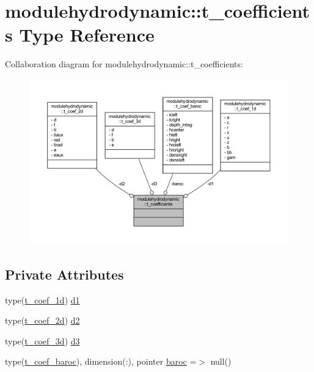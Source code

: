 \hypertarget{structmodulehydrodynamic_1_1t__coefficients}{}\section{modulehydrodynamic\+:\+:t\+\_\+coefficients Type Reference}
\label{structmodulehydrodynamic_1_1t__coefficients}


Collaboration diagram for modulehydrodynamic\+:\+:t\+\_\+coefficients\+:\nopagebreak
\begin{figure}[H]
\begin{center}
\leavevmode
\includegraphics[width=350pt]{structmodulehydrodynamic_1_1t__coefficients__coll__graph}
\end{center}
\end{figure}
\subsection*{Private Attributes}
\begin{DoxyCompactItemize}
\item 
type(\mbox{\hyperlink{structmodulehydrodynamic_1_1t__coef__1d}{t\+\_\+coef\+\_\+1d}}) \mbox{\hyperlink{structmodulehydrodynamic_1_1t__coefficients_af09bfaf9d33ac3ccd2662edfa7eff19b}{d1}}
\item 
type(\mbox{\hyperlink{structmodulehydrodynamic_1_1t__coef__2d}{t\+\_\+coef\+\_\+2d}}) \mbox{\hyperlink{structmodulehydrodynamic_1_1t__coefficients_a81edb2a1145e5a97e9aaca7bd5de81c2}{d2}}
\item 
type(\mbox{\hyperlink{structmodulehydrodynamic_1_1t__coef__3d}{t\+\_\+coef\+\_\+3d}}) \mbox{\hyperlink{structmodulehydrodynamic_1_1t__coefficients_aec0a7750b033482743e22ee4740d8cea}{d3}}
\item 
type(\mbox{\hyperlink{structmodulehydrodynamic_1_1t__coef__baroc}{t\+\_\+coef\+\_\+baroc}}), dimension(\+:), pointer \mbox{\hyperlink{structmodulehydrodynamic_1_1t__coefficients_a92af472b0e1060b31821002af91c9d4c}{baroc}} =$>$ null()
\end{DoxyCompactItemize}


